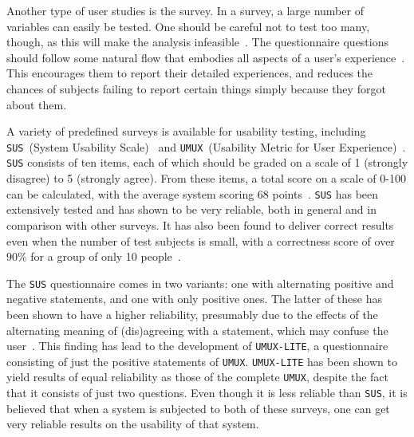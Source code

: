 
Another type of user studies is the survey. In a survey, a large number of variables can easily be tested. One should be careful not to test too many, though, as this will make the analysis infeasible~\cite{wohlin2003empirical}. The questionnaire questions should follow some natural flow that embodies all aspects of a user's experience~\cite{tuch2013analyzing}. This encourages them to report their detailed experiences, and reduces the chances of subjects failing to report certain things simply because they forgot about them.

A variety of predefined surveys is available for usability testing, including \verb|SUS|~(System Usability Scale)~\cite{brooke2013sus} and \verb|UMUX|~(Usability Metric for User Experience)~\cite{lewis2013umux}. \verb|SUS| consists of ten items, each of which should be graded on a scale of 1 (strongly disagree) to 5 (strongly agree). From these items, a total score on a scale of 0-100 can be calculated, with the average system scoring 68 points~\cite{sauro2011measuring}. \verb|SUS| has been extensively tested and has shown to be very reliable, both in general and in comparison with other surveys. It has also been found to deliver correct results even when the number of test subjects is small, with a correctness score of over $90\%$ for a group of only 10 people~\cite{tullis2004comparison}.

The \verb|SUS| questionnaire comes in two variants: one with alternating positive and negative statements, and one with only positive ones. The latter of these has been shown to have a higher reliability, presumably due to the effects of the alternating meaning of (dis)agreeing with a statement, which may confuse the user~\cite{lewis2013umux}. This finding has lead to the development of \verb|UMUX-LITE|, a questionnaire consisting of just the positive statements of \verb|UMUX|. \verb|UMUX-LITE| has been shown to yield results of equal reliability as those of the complete \verb|UMUX|, despite the fact that it consists of just two questions. Even though it is less reliable than \verb|SUS|, it is believed that when a system is subjected to both of these surveys, one can get very reliable results on the usability of that system.

